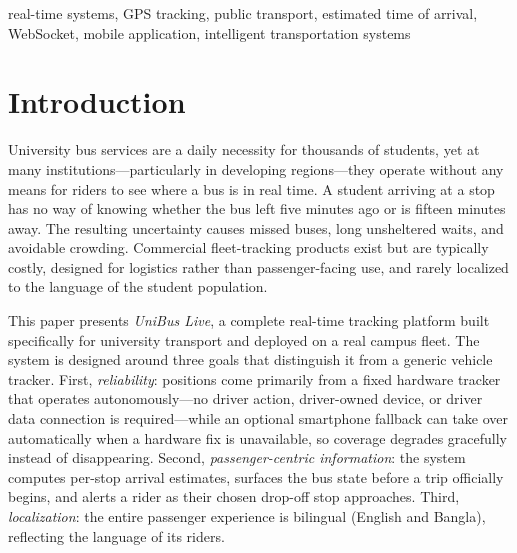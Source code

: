 \documentclass[conference]{IEEEtran}
\begin{document}
\begin{IEEEkeywords}
real-time systems, GPS tracking, public transport, estimated time of
arrival, WebSocket, mobile application, intelligent transportation systems
\end{IEEEkeywords}

\section{Introduction}
\label{sec:intro}
University bus services are a daily necessity for thousands of students,
yet at many institutions---particularly in developing regions---they
operate without any means for riders to see where a bus is in real time. A
student arriving at a stop has no way of knowing whether the bus left five
minutes ago or is fifteen minutes away. The resulting uncertainty causes
missed buses, long unsheltered waits, and avoidable crowding. Commercial fleet-tracking
products exist but are typically costly, designed for logistics rather than
passenger-facing use, and rarely localized to the language of the student
population.

This paper presents \emph{UniBus Live}, a complete real-time tracking
platform built specifically for university transport and deployed on a real
campus fleet. The system is designed around three goals that distinguish it
from a generic vehicle tracker. First, \emph{reliability}: positions come primarily from a fixed hardware
tracker that operates autonomously---no driver action, driver-owned device,
or driver data connection is required---while an optional smartphone
fallback can take over automatically when a hardware fix is unavailable, so
coverage degrades gracefully instead of disappearing. Second, \emph{passenger-centric information}: the
system computes per-stop arrival estimates, surfaces the bus state before a
trip officially begins, and alerts a rider as their chosen drop-off stop
approaches. Third, \emph{localization}: the entire passenger experience is
bilingual (English and Bangla), reflecting the language of its riders.
\end{document}
